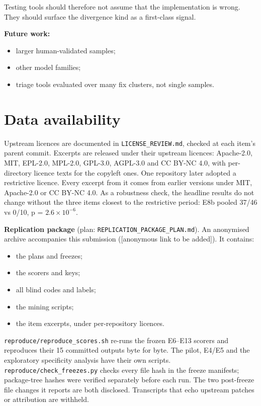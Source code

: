 \documentclass[acmsmall,screen,review,anonymous]{acmart}
\begin{document}
Testing tools should therefore not assume that the implementation is wrong. They should surface the divergence kind as a first-class signal.

\textbf{Future work:}
\begin{itemize}
\item larger human-validated samples;
\item other model families;
\item triage tools evaluated over many fix clusters, not single samples.
\end{itemize}

\section{Data availability}
Upstream licences are documented in \texttt{LICENSE\_REVIEW.md}, checked at each item's parent commit. Excerpts are released under their upstream licences: Apache-2.0, MIT, EPL-2.0, MPL-2.0, GPL-3.0, AGPL-3.0 and CC BY-NC 4.0, with per-directory licence texts for the copyleft ones. One repository later adopted a restrictive licence. Every excerpt from it comes from earlier versions under MIT, Apache-2.0 or CC BY-NC 4.0. As a robustness check, the headline results do not change without the three items closest to the restrictive period: E8b pooled 37/46 vs 0/10, p = $2.6 \times 10^{-6}$.

\textbf{Replication package} (plan: \texttt{REPLICATION\_PACKAGE\_PLAN.md}). An anonymised archive accompanies this submission ([anonymous link to be added]). It contains:
\begin{itemize}
\item the plans and freezes;
\item the scorers and keys;
\item all blind codes and labels;
\item the mining scripts;
\item the item excerpts, under per-repository licences.
\end{itemize}

\texttt{reproduce/\allowbreak{}reproduce\_scores.sh} re-runs the frozen E6--E13 scorers and reproduces their 15 committed outputs byte for byte. The pilot, E4/E5 and the exploratory specificity analysis have their own scripts. \texttt{reproduce/\allowbreak{}check\_freezes.py} checks every file hash in the freeze manifests; package-tree hashes were verified separately before each run. The two post-freeze file changes it reports are both disclosed. Transcripts that echo upstream patches or attribution are withheld.
\end{document}

